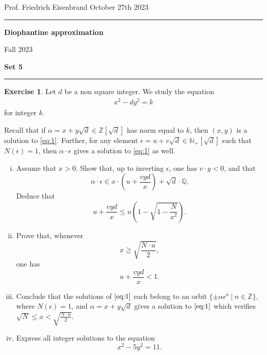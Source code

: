 \documentclass[12pt,a4paper]{article}
\date{}
\theoremstyle{plain}
\newtheorem*{Sol*}{Solution}
\theoremstyle{definition}
\newtheorem{Ex}{Exercise}
\def \N {\mathbb N}
\def \Q {\mathbb Q}
\def \Z {\mathbb Z}
\newif\ifsolutions
\newcommand{\exercise}[2]{
			\begin{Ex} #1 \end{Ex}
			\ifsolutions  \begin{Sol*} #2 \end{Sol*} \bigskip \else \bigskip  \fi
		}
\begin{document}
\begin{center}
{Prof. Friedrich Eisenbrand \hfill October 27th 2023}
\end{center}
	
\hrule\vspace{\baselineskip}

\begin{center}
\textbf{Diophantine approximation}

Fall 2023

\bigskip

\textbf{Set 5}
\ifsolutions{\textbf{- Solutions}} \else{} \fi
\end{center}

\hrule\vspace{\baselineskip}




\exercise{
	Let $d$ be a non square integer.
	We study the equation 
	\begin{align}\label{eq:1} x^2 - dy^2 = k \end{align}
	for integer $k$.

	Recall that if $\alpha = x + y\sqrt{d} \in \Z[\sqrt{d}]$ has norm equal to $k$, then $(x,y)$ is a solution to \eqref{eq:1}.
	Further, for any element $\epsilon = u + v \sqrt{d} \in \N_+[\sqrt{d}]$ such that $N(\epsilon)=1$, then $\alpha \cdot \epsilon$ gives a solution to \eqref{eq:1} as well.

	\begin{enumerate}[i)]
		\item Assume that $x > 0$. Show that, up to inverting $\epsilon$, one has $v \cdot y < 0$, and that
			\[ \alpha \cdot \epsilon \in x \cdot \left(u+ \frac{vyd}{x} \right) + \sqrt{d} \cdot \Q. \]
		Deduce that
			\[ u+ \frac{vyd}{x} \leq u \left( 1 - \sqrt{1-\frac{N}{x^2}} \right).\]

		\item Prove that, whenever
			\[ x \geq \sqrt{\frac{N \cdot u}{2}}, \]
		one has
			\[ u+ \frac{vyd}{x} < 1. \]

		\item Conclude that the solutions of $\eqref{eq:1}$ each belong to an orbit $\{ \pm \alpha \epsilon^n \ | \ n \in \Z \}$, where $N(\epsilon)=1$, and $\alpha = x + y\sqrt{d}$ gives a solution to $\eqref{eq:1}$ which verifies $\sqrt{N} \leq x < \sqrt{\frac{N \cdot u}{2}}$.
		
		\item Express all integer solutions to the equation
			\[ x^2 - 5y^2 = 11. \]
	\end{enumerate}

}
{}
  
\end{document}
